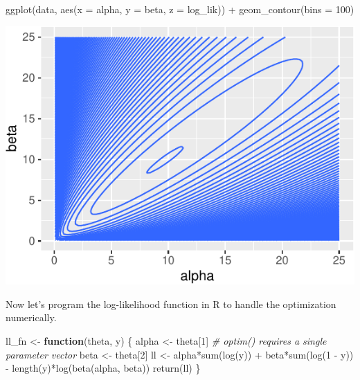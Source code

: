 \documentclass[
]{book}
\newenvironment{Shaded}{\begin{snugshade}}{\end{snugshade}}
\newcommand{\AttributeTok}[1]{\textcolor[rgb]{0.77,0.63,0.00}{#1}}
\newcommand{\CommentTok}[1]{\textcolor[rgb]{0.56,0.35,0.01}{\textit{#1}}}
\newcommand{\ControlFlowTok}[1]{\textcolor[rgb]{0.13,0.29,0.53}{\textbf{#1}}}
\newcommand{\DecValTok}[1]{\textcolor[rgb]{0.00,0.00,0.81}{#1}}
\newcommand{\FunctionTok}[1]{\textcolor[rgb]{0.00,0.00,0.00}{#1}}
\newcommand{\NormalTok}[1]{#1}
\newcommand{\OtherTok}[1]{\textcolor[rgb]{0.56,0.35,0.01}{#1}}
\newcommand{\SpecialCharTok}[1]{\textcolor[rgb]{0.00,0.00,0.00}{#1}}
\begin{document}
\begin{Shaded}
\begin{Highlighting}[]
\FunctionTok{ggplot}\NormalTok{(data, }\FunctionTok{aes}\NormalTok{(}\AttributeTok{x =}\NormalTok{ alpha, }\AttributeTok{y =}\NormalTok{ beta, }\AttributeTok{z =}\NormalTok{ log\_lik)) }\SpecialCharTok{+} 
  \FunctionTok{geom\_contour}\NormalTok{(}\AttributeTok{bins =} \DecValTok{100}\NormalTok{)}
\end{Highlighting}
\end{Shaded}

\includegraphics{01-01-maximum-likelihood_files/figure-latex/unnamed-chunk-6-1.pdf}

Now let's program the log-likelihood function in R to handle the
optimization numerically.

\begin{Shaded}
\begin{Highlighting}[]
\NormalTok{ll\_fn }\OtherTok{\textless{}{-}} \ControlFlowTok{function}\NormalTok{(theta, y) \{}
\NormalTok{  alpha }\OtherTok{\textless{}{-}}\NormalTok{ theta[}\DecValTok{1}\NormalTok{]  }\CommentTok{\# optim() requires a single parameter vector}
\NormalTok{  beta }\OtherTok{\textless{}{-}}\NormalTok{ theta[}\DecValTok{2}\NormalTok{]}
\NormalTok{  ll }\OtherTok{\textless{}{-}}\NormalTok{ alpha}\SpecialCharTok{*}\FunctionTok{sum}\NormalTok{(}\FunctionTok{log}\NormalTok{(y)) }\SpecialCharTok{+}\NormalTok{ beta}\SpecialCharTok{*}\FunctionTok{sum}\NormalTok{(}\FunctionTok{log}\NormalTok{(}\DecValTok{1} \SpecialCharTok{{-}}\NormalTok{ y)) }\SpecialCharTok{{-}} 
           \FunctionTok{length}\NormalTok{(y)}\SpecialCharTok{*}\FunctionTok{log}\NormalTok{(}\FunctionTok{beta}\NormalTok{(alpha, beta))}
  \FunctionTok{return}\NormalTok{(ll)}
\NormalTok{\}}
\end{Highlighting}
\end{Shaded}
\end{document}
